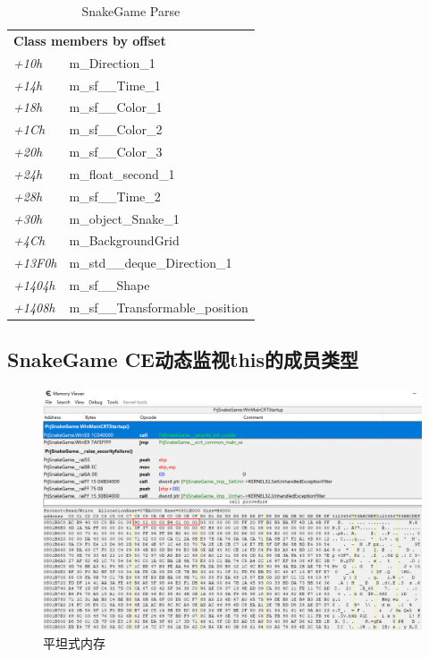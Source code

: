 \documentclass[AutoFakeBold,AutoFakeSlant]{beamer}
\begin{document}
	\begin{frame}[fragile]
		\footnotesize
		\begin{table}[htbp] %
			\centering %
			\caption{SnakeGame Parse}
			\begin{tabular}{p{1cm}p{5cm}}
				\toprule
				\multicolumn{2}{l}{\textbf{Class members by offset}}     \\
					\emph{+10h  } & m\_Direction\_1                      \\
					\emph{+14h  } & m\_sf\_\_Time\_1                     \\
					\emph{+18h  } & m\_sf\_\_Color\_1                    \\
					\emph{+1Ch  } & m\_sf\_\_Color\_2                    \\
					\emph{+20h  } & m\_sf\_\_Color\_3                    \\
					\emph{+24h  } & m\_float\_second\_1                  \\
					\emph{+28h  } & m\_sf\_\_Time\_2                     \\
					\emph{+30h  } & m\_object\_Snake\_1                  \\
					\emph{+4Ch  } & m\_BackgroundGrid                    \\
					\emph{+13F0h} & m\_std\_\_deque\_Direction\_1        \\
					\emph{+1404h} & m\_sf\_\_Shape                       \\
					\emph{+1408h} & m\_sf\_\_Transformable\_position     \\
				\bottomrule
			\end{tabular}
		\end{table}
	\end{frame}
	
	
	\subsection{SnakeGame CE动态监视this的成员类型}
	\begin{frame}[fragile]
		\begin{figure}
			\centering %
			\includegraphics[width=\linewidth]{CE_MEM_FLAT.png}
			\caption{平坦式内存}
			\label{fig:CE_MEM_FLAT}
		\end{figure}
	\end{frame}
	
\end{document}
